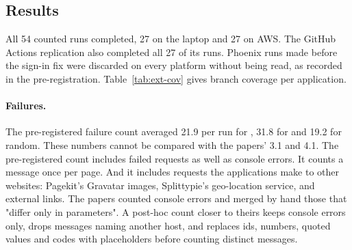\subsection{Results}

All 54 counted runs completed, 27 on the laptop and 27 on AWS. The GitHub Actions
replication also completed all 27 of its runs. Phoenix runs made before the sign-in fix were
discarded on every platform without being read, as recorded in the pre-registration.
Table~\ref{tab:ext-cov} gives branch coverage per application.

\begin{table}[H]
\centering
\small
\caption{External comparison: client-side branch coverage (\%), mean [min, max] over three
one-hour runs, beside the published means (five runs) of WebExplor and
WebRLED~\cite{gu2025webrled}.}
\label{tab:ext-cov}
\end{table}

\paragraph{Failures.} The pre-registered failure count averaged 21.9 per run for
, 31.8 for  and 19.2 for random. These numbers
cannot be compared with the papers' 3.1 and 4.1. The pre-registered count includes failed
requests as well as console errors. It counts a message once per page. And it includes
requests the applications make to other websites: Pagekit's Gravatar images, Splittypie's
geo-location service, and external links. The papers counted console errors and merged by
hand those that "differ only in parameters". A post-hoc count closer to theirs keeps console
errors only, drops messages naming another host, and replaces ids, numbers, quoted values
and codes with placeholders before counting distinct messages.

